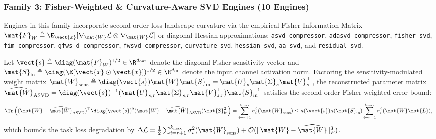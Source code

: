 \subsubsection{Family 3: Fisher-Weighted \& Curvature-Aware SVD Engines (10 Engines)}
Engines in this family incorporate second-order loss landscape curvature via the empirical Fisher Information Matrix $\mat{F}_W \triangleq \E_{\vect{x}} [\nabla_{\mat{W}} \mathcal{L} \otimes \nabla_{\mat{W}} \mathcal{L}]$ or diagonal Hessian approximations: \texttt{asvd\_compressor}, \texttt{adasvd\_compressor}, \texttt{fisher\_svd}, \texttt{fim\_compressor}, \texttt{gfws\_d\_compressor}, \texttt{fwsvd\_compressor}, \texttt{curvature\_svd}, \texttt{hessian\_svd}, \texttt{aa\_svd}, and \texttt{residual\_svd}.
\begin{theorem}
\label{thm:frob_fisher_svd}
Let $\vect{s} \triangleq \diag(\mat{F}_W)^{1/2} \in \R^{d_{\text{out}}}$ denote the diagonal Fisher sensitivity vector and $\mat{S}_{\text{in}} \triangleq \diag(\E[\vect{x} \odot \vect{x}])^{1/2} \in \R^{d_{\text{in}}}$ denote the input channel activation norm. Factoring the sensitivity-modulated weight matrix $\mat{W}_{\text{sens}} \triangleq \diag(\vect{s}) \mat{W} \mat{S}_{\text{in}} = \mat{U}_s \mat{\Sigma}_s \mat{V}_s^\top$, the reconstructed parameter matrix $\widehat{\mat{W}}_{\text{ASVD}} = \diag(\vect{s})^{-1} (\mat{U}_{s,r} \mat{\Sigma}_{s,r} \mat{V}_{s,r}^\top) \mat{S}_{\text{in}}^{-1}$ satisfies the second-order Fisher-weighted error bound:
\begin{equation}
\Tr\left( (\mat{W} - \widehat{\mat{W}}_{\text{ASVD}})^\top \diag(\vect{s})^2 (\mat{W} - \widehat{\mat{W}}_{\text{ASVD}}) \mat{S}_{\text{in}}^2 \right) = \sum_{i=r+1}^{k_{\max}} \sigma_i^2(\mat{W}_{\text{sens}}) \le \kappa(\vect{s}) \kappa(\mat{S}_{\text{in}}) \sum_{i=r+1}^{k_{\max}} \sigma_i^2(\mat{W} \mat{L}),
\label{eq:frob_bound_fisher_family}
\end{equation}
which bounds the task loss degradation by $\Delta \mathcal{L} = \frac{1}{2} \sum_{i=r+1}^{k_{\max}} \sigma_i^2(\mat{W}_{\text{sens}}) + \mathcal{O}(\|\mat{W} - \widehat{\mat{W}}\|_F^3)$.
\end{theorem}

